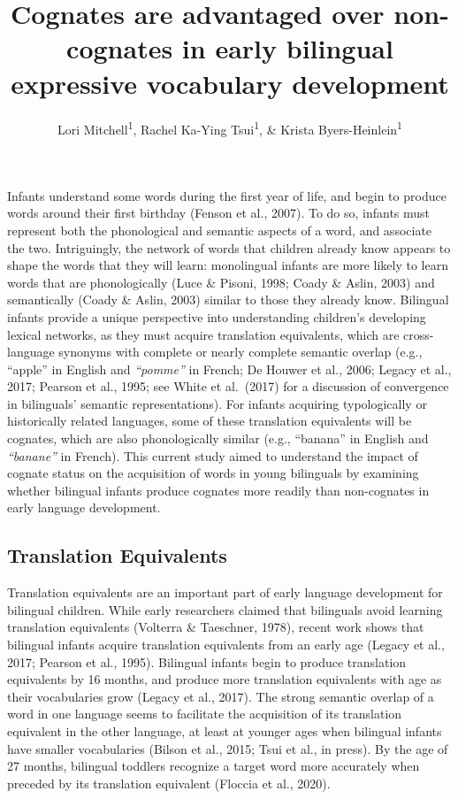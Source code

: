 \documentclass[
  ,man,floatsintext]{apa6}
\title{Cognates are advantaged over non-cognates in early bilingual expressive vocabulary development}
\author{Lori Mitchell\textsuperscript{1}, Rachel Ka-Ying Tsui\textsuperscript{1}, \& Krista Byers-Heinlein\textsuperscript{1}}
\date{}
\affiliation{\vspace{0.5cm}\textsuperscript{1} Concordia University}
\begin{document}
\maketitle

\captionsetup[table]{labelformat=empty}

Infants understand some words during the first year of life, and begin to produce words around their first birthday (Fenson et al., 2007). To do so, infants must represent both the phonological and semantic aspects of a word, and associate the two. Intriguingly, the network of words that children already know appears to shape the words that they will learn: monolingual infants are more likely to learn words that are phonologically (Luce \& Pisoni, 1998; Coady \& Aslin, 2003) and semantically (Coady \& Aslin, 2003) similar to those they already know. Bilingual infants provide a unique perspective into understanding children's developing lexical networks, as they must acquire translation equivalents, which are cross-language synonyms with complete or nearly complete semantic overlap (e.g., ``apple'' in English and \emph{``pomme''} in French; De Houwer et al., 2006; Legacy et al., 2017; Pearson et al., 1995; see White et al.~(2017) for a discussion of convergence in bilinguals' semantic representations). For infants acquiring typologically or historically related languages, some of these translation equivalents will be cognates, which are also phonologically similar (e.g., ``banana''  in English and \emph{``banane''}  in French). This current study aimed to understand the impact of cognate status on the acquisition of words in young bilinguals by examining whether bilingual infants produce cognates more readily than non-cognates in early language development.

\hypertarget{translation-equivalents}{%
\subsection{Translation Equivalents}\label{translation-equivalents}}

Translation equivalents are an important part of early language development for bilingual children. While early researchers claimed that bilinguals avoid learning translation equivalents (Volterra \& Taeschner, 1978), recent work shows that bilingual infants acquire translation equivalents from an early age (Legacy et al., 2017; Pearson et al., 1995). Bilingual infants begin to produce translation equivalents by 16 months, and produce more translation equivalents with age as their vocabularies grow (Legacy et al., 2017). The strong semantic overlap of a word in one language seems to facilitate the acquisition of its translation equivalent in the other language, at least at younger ages when bilingual infants have smaller vocabularies (Bilson et al., 2015; Tsui et al., in press). By the age of 27 months, bilingual toddlers recognize a target word more accurately when preceded by its translation equivalent (Floccia et al., 2020).
\end{document}
